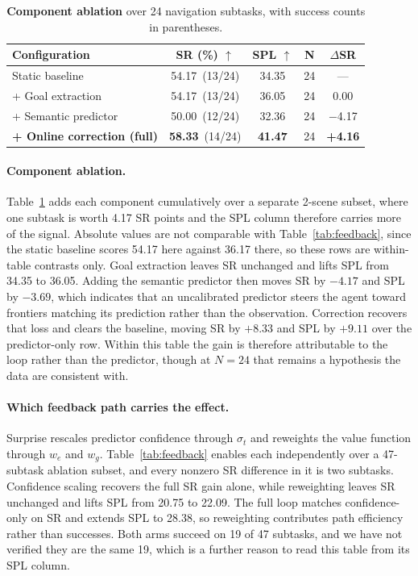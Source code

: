 \begin{table}[htbp]
\centering
\caption{\textbf{Component ablation} over 24 navigation subtasks, with success counts in parentheses.}
\label{tab:ablation_all}
\footnotesize
\setlength{\tabcolsep}{3pt}
\begin{tabular}{@{}l|cccc@{}}
\toprule
\textbf{Configuration} & \textbf{SR (\%)} $\uparrow$ & \textbf{SPL} $\uparrow$ & \textbf{N} & $\Delta$\textbf{SR} \\
\midrule
Static baseline & 54.17 \,\scriptsize(13/24) & 34.35 & 24 & --- \\
\quad + Goal extraction & 54.17 \,\scriptsize(13/24) & 36.05 & 24 & 0.00 \\
\quad + Semantic predictor & 50.00 \,\scriptsize(12/24) & 32.36 & 24 & $-$4.17 \\
\quad \textbf{+ Online correction (full)} & \textbf{58.33} \,\scriptsize(14/24) & \textbf{41.47} & 24 & \textbf{+4.16} \\
\bottomrule
\end{tabular}
\end{table}

\paragraph{Component ablation.} Table~\ref{tab:ablation_all} adds each component cumulatively over a separate 2-scene subset, where one subtask is worth 4.17 SR points and the SPL column therefore carries more of the signal. Absolute values are not comparable with Table~\ref{tab:feedback}, since the static baseline scores 54.17 here against 36.17 there, so these rows are within-table contrasts only. Goal extraction leaves SR unchanged and lifts SPL from 34.35 to 36.05. Adding the semantic predictor then moves SR by $-4.17$ and SPL by $-3.69$, which indicates that an uncalibrated predictor steers the agent toward frontiers matching its prediction rather than the observation. Correction recovers that loss and clears the baseline, moving SR by $+8.33$ and SPL by $+9.11$ over the predictor-only row. Within this table the gain is therefore attributable to the loop rather than the predictor, though at $N = 24$ that remains a hypothesis the data are consistent with.

\paragraph{Which feedback path carries the effect.} Surprise rescales predictor confidence through $\sigma_t$ and reweights the value function through $w_e$ and $w_g$. Table~\ref{tab:feedback} enables each independently over a 47-subtask ablation subset, and every nonzero SR difference in it is two subtasks. Confidence scaling recovers the full SR gain alone, while reweighting leaves SR unchanged and lifts SPL from 20.75 to 22.09. The full loop matches confidence-only on SR and extends SPL to 28.38, so reweighting contributes path efficiency rather than successes. Both arms succeed on 19 of 47 subtasks, and we have not verified they are the same 19, which is a further reason to read this table from its SPL column.

